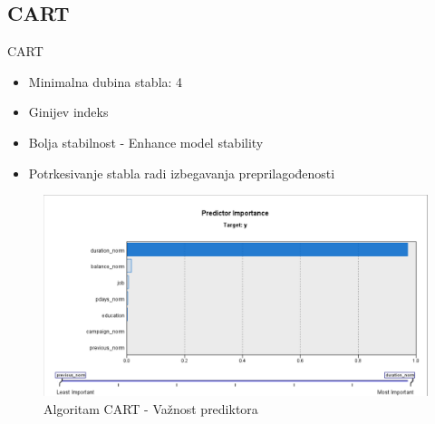 \documentclass{beamer}
\begin{document}
\subsection{CART}

\begin{frame}{CART}
	 \begin{itemize}
        \item Minimalna dubina stabla: 4
        \item Ginijev indeks
        \item Bolja stabilnost - Enhance model stability
		\item Potrkesivanje stabla radi izbegavanja preprilagođenosti        
    \end{itemize}
    \begin{figure}[h!]
                \begin{center}
                \includegraphics[scale=0.30]{cart_predictor.png}
                \end{center}
                \caption{Algoritam CART - Važnost prediktora}
             \end{figure}
\end{frame}
\end{document}
